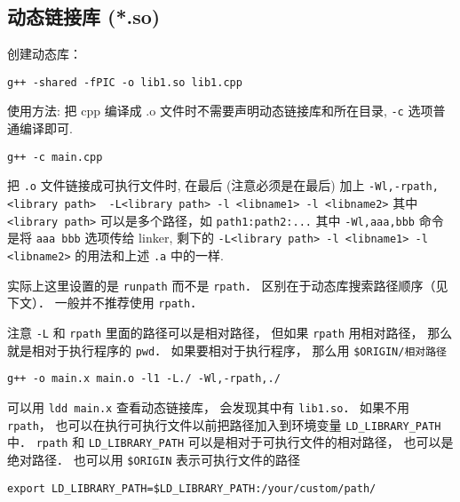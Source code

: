 \subsection{动态链接库 (*.so)}
创建动态库：
\begin{lstlisting}[language=none]
g++ -shared -fPIC -o lib1.so lib1.cpp
\end{lstlisting}

使用方法:
把 cpp 编译成 .o 文件时不需要声明动态链接库和所在目录, \verb`-c` 选项普通编译即可.
\begin{lstlisting}[language=none]
g++ -c main.cpp
\end{lstlisting}
把 \verb|.o| 文件链接成可执行文件时, 在最后 (注意必须是在最后) 加上
\verb`-Wl,-rpath,<library path>  -L<library path> -l <libname1> -l <libname2>` 其中 \verb|<library path>| 可以是多个路径，如 \verb|path1:path2:...|
其中 \verb`-Wl,aaa,bbb` 命令是将 \verb`aaa bbb` 选项传给 linker, 剩下的 \verb`-L<library path> -l <libname1> -l <libname2>` 的用法和上述 \verb|.a| 中的一样.
\item 实际上这里设置的是 \verb|runpath| 而不是 \verb|rpath|． 区别在于动态库搜索路径顺序（见下文）． 一般并不推荐使用 \verb|rpath|．
\item 注意 \verb|-L| 和 \verb|rpath| 里面的路径可以是相对路径， 但如果 \verb|rpath| 用相对路径， 那么就是相对于执行程序的 \verb|pwd|． 如果要相对于执行程序， 那么用 \verb|$ORIGIN/相对路径|
\begin{lstlisting}[language=none]
g++ -o main.x main.o -l1 -L./ -Wl,-rpath,./
\end{lstlisting}
可以用 \verb|ldd main.x| 查看动态链接库， 会发现其中有 \verb|lib1.so|． 如果不用 \verb|rpath|， 也可以在执行可执行文件以前把路径加入到环境变量 \verb`LD_LIBRARY_PATH` 中． \verb|rpath| 和 \verb|LD_LIBRARY_PATH| 可以是相对于可执行文件的相对路径， 也可以是绝对路径． 也可以用 \verb|$ORIGIN| 表示可执行文件的路径
\begin{lstlisting}[language=none]
export LD_LIBRARY_PATH=$LD_LIBRARY_PATH:/your/custom/path/
\end{lstlisting}
